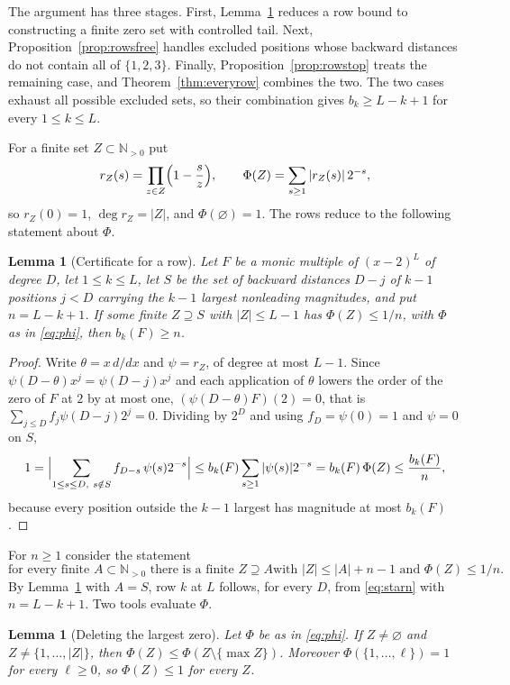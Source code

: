 \documentclass[11pt]{article}
\newtheorem{lemma}[theorem]{Lemma}
\newcommand{\N}{\mathbb N}
\begin{document}
The argument has three stages.  First, Lemma~\ref{lem:rowcert} reduces a row
bound to constructing a finite zero set with controlled tail.  Next,
Proposition~\ref{prop:rowsfree} handles excluded positions whose backward
distances do not contain all of $\{1,2,3\}$.  Finally,
Proposition~\ref{prop:rowstop}
treats the remaining case, and Theorem~\ref{thm:everyrow} combines the two.
The two cases exhaust all possible excluded sets, so their combination gives
$b_k\ge L-k+1$ for every $1\le k\le L$.

For a finite set $Z\subset\N_{>0}$ put
\begin{equation}\label{eq:phi}
  r_Z(s)=\prod_{z\in Z}\Bigl(1-\frac sz\Bigr),\qquad
  \Phi(Z)=\sum_{s\ge1}|r_Z(s)|\,2^{-s},
\end{equation}
so $r_Z(0)=1$, $\deg r_Z=|Z|$, and $\Phi(\varnothing)=1$.  The rows reduce to
the following statement about $\Phi$.

\begin{lemma}[Certificate for a row]\label{lem:rowcert}
Let $F$ be a monic multiple of $(x-2)^L$ of degree $D$, let $1\le k\le L$,
let $S$ be the set of backward distances $D-j$ of $k-1$ positions $j<D$
carrying the $k-1$ largest nonleading magnitudes, and put $n=L-k+1$.  If
some finite $Z\supseteq S$ with $|Z|\le L-1$ has $\Phi(Z)\le1/n$, with
$\Phi$ as in \eqref{eq:phi}, then $b_k(F)\ge n$.
\end{lemma}

\begin{proof}
Write $\theta=x\,d/dx$ and $\psi=r_Z$, of degree at most $L-1$.  Since
$\psi(D-\theta)x^j=\psi(D-j)x^j$ and each application of $\theta$ lowers the order
of the zero of $F$ at $2$ by at most one, $(\psi(D-\theta)F)(2)=0$, that is
$\sum_{j\le D}f_j\psi(D-j)2^{j}=0$.  Dividing by $2^D$ and using $f_D=\psi(0)=1$
and $\psi=0$ on $S$,
\[
  1=\Bigl|\sum_{1\le s\le D,\ s\notin S}f_{D-s}\,\psi(s)2^{-s}\Bigr|
   \le b_k(F)\sum_{s\ge1}|\psi(s)|2^{-s}=b_k(F)\,\Phi(Z)\le\frac{b_k(F)}n,
\]
because every position outside the $k-1$ largest has magnitude at most
$b_k(F)$.
\end{proof}

For $n\ge1$ consider the statement
\[\tag{$\ast_n$}\label{eq:starn}
  \text{for every finite $A\subset\N_{>0}$ there is a finite $Z\supseteq A$
  with $|Z|\le|A|+n-1$ and $\Phi(Z)\le1/n$.}
\]
By Lemma~\ref{lem:rowcert} with $A=S$, row $k$ at $L$ follows, for every
$D$, from \eqref{eq:starn} with $n=L-k+1$.  Two tools evaluate $\Phi$.

\begin{lemma}[Deleting the largest zero]\label{lem:confdel}
Let $\Phi$ be as in \eqref{eq:phi}.  If $Z\ne\varnothing$ and
$Z\ne\{1,\ldots,|Z|\}$, then $\Phi(Z)\le\Phi(Z\setminus\{\max Z\})$.  Moreover
$\Phi(\{1,\ldots,\ell\})=1$ for every $\ell\ge0$, so $\Phi(Z)\le1$ for every
$Z$.
\end{lemma}
\end{document}
